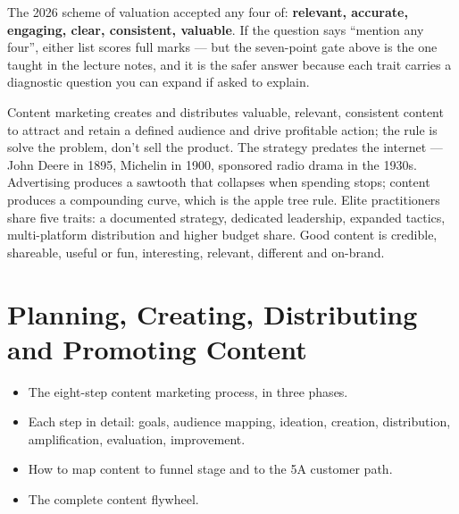 \documentclass{MMTextbook}
\begin{document}
\begin{exambox}
The 2026 scheme of valuation accepted any four of: \textbf{relevant, accurate,
engaging, clear, consistent, valuable}. If the question says ``mention any
four'', either list scores full marks --- but the seven-point gate above is the
one taught in the lecture notes, and it is the safer answer because each trait
carries a diagnostic question you can expand if asked to explain.
\end{exambox}

\begin{summarybox}
Content marketing creates and distributes valuable, relevant, consistent content
to attract and retain a defined audience and drive profitable action; the rule
is solve the problem, don't sell the product. The strategy predates the internet
--- John Deere in 1895, Michelin in 1900, sponsored radio drama in the 1930s.
Advertising produces a sawtooth that collapses when spending stops; content
produces a compounding curve, which is the apple tree rule. Elite practitioners
share five traits: a documented strategy, dedicated leadership, expanded
tactics, multi-platform distribution and higher budget share. Good content is
credible, shareable, useful or fun, interesting, relevant, different and
on-brand.
\end{summarybox}

\chapter{Planning, Creating, Distributing and Promoting Content}


\begin{learningoutcomes}
\begin{itemize}
\item The eight-step content marketing process, in three phases.
\item Each step in detail: goals, audience mapping, ideation, creation,
      distribution, amplification, evaluation, improvement.
\item How to map content to funnel stage and to the 5A customer path.
\item The complete content flywheel.
\end{itemize}
\end{learningoutcomes}
\end{document}
